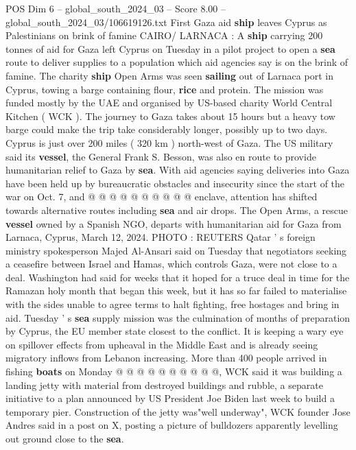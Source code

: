 \begin{textsample}{POS Dim 6 – global\_south\_2024\_03 – Score 8.00 – global\_south\_2024\_03/106619126.txt}  \label{ex:f6_pos_067}
First Gaza aid \textbf{ship} leaves Cyprus as Palestinians on brink of famine CAIRO/ LARNACA : A \textbf{ship} carrying 200 tonnes of aid for Gaza left Cyprus on Tuesday in a pilot project to open a \textbf{sea} route to deliver supplies to a population which aid agencies say is on the brink of famine.
The charity \textbf{ship} Open Arms was seen \textbf{sailing} out of Larnaca port in Cyprus, towing a barge containing flour, \textbf{rice} and protein.
The mission was funded mostly by the UAE and organised by US-based charity World Central Kitchen ( WCK ).
The journey to Gaza takes about 15 hours but a heavy tow barge could make the trip take considerably longer, possibly up to two days.
Cyprus is just over 200 miles ( 320 km ) north-west of Gaza.
The US military said its \textbf{vessel}, the General Frank S.
Besson, was also en route to provide humanitarian relief to Gaza by \textbf{sea}.
With aid agencies saying deliveries into Gaza have been held up by bureaucratic obstacles and insecurity since the start of the war on Oct. 7, and @ @ @ @ @ @ @ @ @ @ enclave, attention has shifted towards alternative routes including \textbf{sea} and air drops.
The Open Arms, a rescue \textbf{vessel} owned by a Spanish NGO, departs with humanitarian aid for Gaza from Larnaca, Cyprus, March 12, 2024.
PHOTO : REUTERS Qatar ' s foreign ministry spokesperson Majed Al-Ansari said on Tuesday that negotiators seeking a ceasefire between Israel and Hamas, which controls Gaza, were not close to a deal.
Washington had said for weeks that it hoped for a truce deal in time for the Ramazan holy month that began this week, but it has so far failed to materialise with the sides unable to agree terms to halt fighting, free hostages and bring in aid.
Tuesday ' s \textbf{sea} supply mission was the culmination of months of preparation by Cyprus, the EU member state closest to the conflict.
It is keeping a wary eye on spillover effects from upheaval in the Middle East and is already seeing migratory inflows from Lebanon increasing.
More than 400 people arrived in fishing \textbf{boats} on Monday @ @ @ @ @ @ @ @ @ @, WCK said it was building a landing jetty with material from destroyed buildings and rubble, a separate initiative to a plan announced by US President Joe Biden last week to build a temporary pier.
Construction of the jetty was"well underway", WCK founder Jose Andres said in a post on X, posting a picture of bulldozers apparently levelling out ground close to the \textbf{sea}.

\end{textsample}
